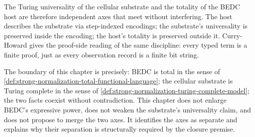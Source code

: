 The Turing universality of the cellular substrate and the totality of the BEDC host are therefore independent axes that meet without interfering. The host describes the substrate via step-indexed encodings; the substrate's universality is preserved inside the encoding; the host's totality is preserved outside it. Curry-Howard gives the proof-side reading of the same discipline: every typed term is a finite proof, just as every observation record is a finite bit string.

The boundary of this chapter is precisely: BEDC is total in the sense of \autoref{def:strong-normalization-total-functional-language}; the cellular substrate is Turing complete in the sense of \autoref{def:strong-normalization-turing-complete-model}; the two facts coexist without contradiction. This chapter does not enlarge BEDC's expressive power, does not weaken the substrate's universality claim, and does not propose to merge the two axes. It identifies the axes as separate and explains why their separation is structurally required by the closure premise.

